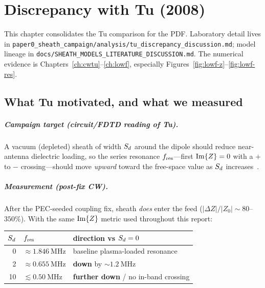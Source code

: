 \chapter{Discrepancy with Tu (2008)}
\label{ch:discrepancy}

This chapter consolidates the Tu comparison for the PDF. Laboratory detail lives in \texttt{paper0_sheath_campaign/analysis/tu\_discrepancy\_discussion.md}; model lineage in \texttt{docs/SHEATH\_MODELS\_LITERATURE\_DISCUSSION.md}. The numerical evidence is Chapters~\ref{ch:cwtu}--\ref{ch:lowf}, especially Figures~\ref{fig:lowf-z}--\ref{fig:lowf-res}.

\section{What Tu motivated, and what we measured}

\paragraph{Campaign target (circuit/FDTD reading of Tu).}
A vacuum (depleted) sheath of width \(S_d\) around the dipole should reduce near-antenna dielectric loading, so the series resonance \(f_{\mathrm{res}}\)---first \(\operatorname{Im}\{Z\}=0\) with a \(+\) to \(-\) crossing---should move \emph{upward} toward the free-space value as \(S_d\) increases~\cite{tu2008}.

\paragraph{Measurement (post-fix CW).}
After the PEC-seeded coupling fix, sheath \emph{does} enter the feed (\(\lvert\Delta Z\rvert/\lvert Z_0\rvert\sim 80\)--\(350\%\)). With the same \(\operatorname{Im}\{Z\}\) metric used throughout this report:

\begin{center}
\begin{tabular}{@{}rll@{}}
\toprule
\(S_d\) & \(f_{\mathrm{res}}\) & direction vs \(S_d=0\) \\
\midrule
0  & \(\approx\SI{1.846}{\mega\hertz}\) & baseline plasma-loaded resonance \\
2  & \(\approx\SI{0.655}{\mega\hertz}\) & \textbf{down} by \(\sim\SI{1.2}{\mega\hertz}\) \\
10 & \(\lesssim\SI{0.50}{\mega\hertz}\) & \textbf{further down} / no in-band crossing \\
\bottomrule
\end{tabular}
\end{center}

